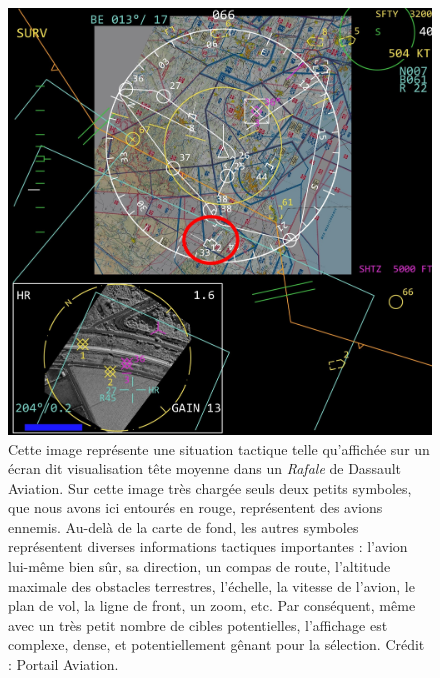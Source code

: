 \begin{appendices}
	\begin{figure}[!htbp]
		\centering
		\includegraphics[width=\textwidth]{figures/ch1/sitac}
		\caption[Situation tactique vue d'un \emph{Rafale}]{Cette image représente une situation tactique telle qu'affichée sur un écran dit \og visualisation tête moyenne \fg{} dans un \emph{Rafale} de Dassault Aviation. Sur cette image très \og chargée \fg{} seuls deux petits symboles, que nous avons ici entourés en rouge, représentent des avions ennemis. Au-delà de la carte de fond, les autres symboles représentent diverses informations tactiques importantes : l'avion lui-même bien sûr, sa direction, un compas de route, l'altitude maximale des obstacles terrestres, l'échelle, la vitesse de l'avion, le plan de vol, la ligne de front, un zoom, etc. Par conséquent, même avec un très petit nombre de cibles potentielles, l'affichage est complexe, dense, et potentiellement gênant pour la sélection. Crédit : Portail Aviation\footnotemark.}
		\label{fig:sitac}
	\end{figure}
	
	

\end{appendices}
